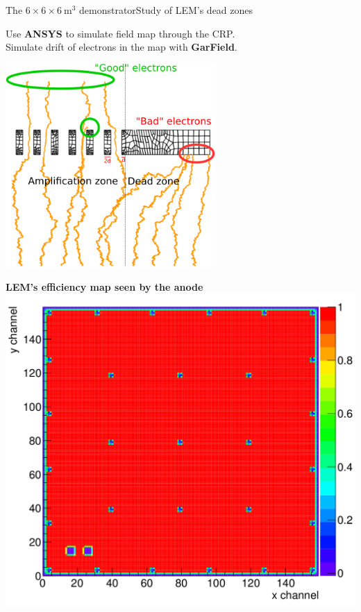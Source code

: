 \documentclass[10pt]{beamer}
\begin{document}
\begin{frame}{The \texorpdfstring{$6 \times 6 \times \SI{6}{\meter\cubed}$}{666} demonstrator}{Study of LEM's dead zones}
\begin{scriptsize}
\begin{minipage}{0.38\textwidth}
   				Use \textbf{ANSYS} to simulate field map through the CRP.\\
   				Simulate drift of electrons in the map with \textbf{GarField}.\\
    		\end{minipage}
    		\begin{minipage}{0.58\textwidth}
    			\centering
    			\includegraphics[width=0.6\textwidth]{figures/666/drift_example.png}\\
    			\vspace{0.5cm} \hspace{0.1cm}
    			\begin{minipage}{0.48\textwidth}
    				\centering
    				\textbf{LEM's efficiency map seen by the anode}\\
    				\includegraphics[width=\textwidth]{figures/666/eff_map.png}

\end{minipage}
\end{minipage}
\end{scriptsize}
\end{frame}
\end{document}
